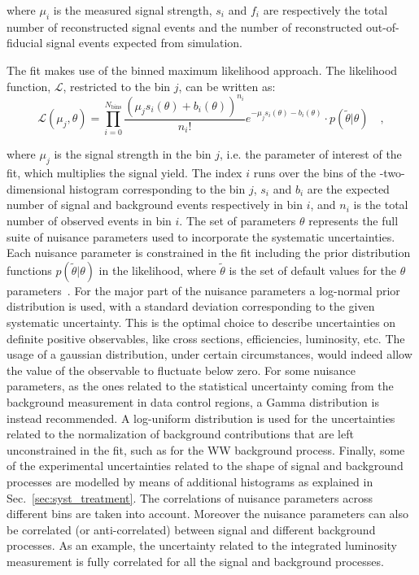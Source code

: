 \noindent where $\mu_i$ is the measured signal strength, $s_i$ and $f_i$ are respectively the total number of reconstructed signal events and the number of reconstructed out-of-fiducial signal events expected from simulation.

The fit makes use of the binned maximum likelihood approach. The likelihood function, $\mathcal{L}$, restricted to the \pth bin $j$, can be written as:
\begin{equation}
\mathcal{L}(\mu_j,\theta) = \prod_{i=0}^{N_\mathrm{bins}} \frac{(\mu_j s_i(\theta) + b_i(\theta))^{n_i}}{n_i!}e^{-\mu_j s_i(\theta) - b_i(\theta)} \cdot p(\tilde{\theta} |\theta ) \quad ,
\end{equation}

\noindent where $\mu_j$ is the signal strength in the bin $j$, i.e. the parameter of interest of the fit, which multiplies the signal yield. The index $i$ runs over the bins of the \mll-\mt two-dimensional histogram corresponding to the \pth bin $j$, $s_i$ and $b_i$ are the expected number of signal and background events respectively in bin $i$, and $n_i$ is the total number of observed events in bin $i$. The set of parameters $\theta$ represents the full suite of nuisance parameters used to incorporate the systematic uncertainties. Each nuisance parameter is constrained in the fit including the prior distribution functions $p(\tilde{\theta}|\theta)$ in the likelihood, where $\tilde{\theta}$ is the set of default values for the $\theta$ parameters~\cite{CMS-NOTE-2011-005}. For the major part of the nuisance parameters a log-normal prior distribution is used, with a standard deviation corresponding to the given systematic uncertainty. This is the optimal choice to describe uncertainties on definite positive observables, like cross sections, efficiencies, luminosity, etc. The usage of a gaussian distribution, under certain circumstances, would indeed allow the value of the observable to fluctuate below zero.
For some nuisance parameters, as the ones related to the statistical uncertainty coming from the background measurement in data control regions, a Gamma distribution is instead recommended. 
A log-uniform distribution is used for the uncertainties related to the normalization of background contributions that are left unconstrained in the fit, such as for the WW background process.
Finally, some of the experimental uncertainties related to the shape of signal and background processes are modelled by means of additional histograms as explained in Sec.~\ref{sec:syst_treatment}. The correlations of nuisance parameters across different \pth bins are taken into account. Moreover the nuisance parameters can also be correlated (or anti-correlated) between signal and different background processes. As an example, the uncertainty related to the integrated luminosity measurement is fully correlated for all the signal and background processes.

